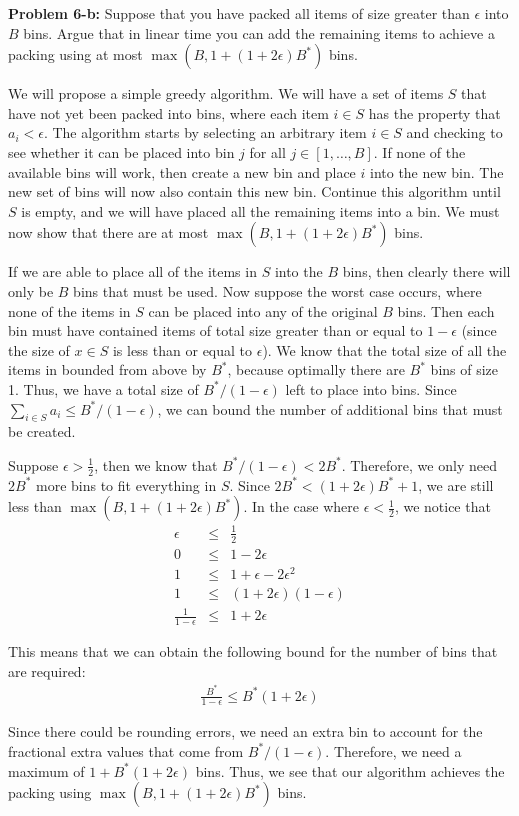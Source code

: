 \documentclass[psamsfonts]{amsart}
\newenvironment{sol}{\vspace{0.25cm}{\large \bfseries Solution:}}{\qedsymbol}
\newenvironment{prob}[1]{\begin{framed}{\large \bfseries Problem #1:}}{\end{framed}}
\begin{document}
\begin{prob}{6-b}
Suppose that you have packed all items of size greater than $\epsilon$ into $B$ bins. Argue that in linear time you can add the remaining items to achieve a packing using at most $\max(B, 1+(1+2\epsilon) B^*)$ bins.
\end{prob}
\begin{sol}
We will propose a simple greedy algorithm. We will have a set of items $S$ that have not yet been packed into bins, where each item $i \in S$ has the property that $a_i < \epsilon$. The algorithm starts by selecting an arbitrary item $i \in S$ and checking to see whether it can be placed into bin $j$ for all $j \in [1,\ldots, B]$. If none of the available bins will work, then create a new bin and place $i$ into the new bin. The new set of bins will now also contain this new bin. Continue this algorithm until $S$ is empty, and we will have placed all the remaining items into a bin. We must now show that there are at most $\max(B, 1 + (1+2 \epsilon) B^*)$ bins.

If we are able to place all of the items in $S$ into the $B$ bins, then clearly there will only be $B$ bins that must be used. Now suppose the worst case occurs, where none of the items in $S$ can be placed into any of the original $B$ bins. Then each bin must have contained items of total size greater than or equal to $1-\epsilon$ (since the size of $x \in S$ is less than or equal to $\epsilon$). We know that the total size of all the items in bounded from above by $B^*$, because optimally there are $B^*$ bins of size 1. Thus, we have a total size of $B^*/(1- \epsilon)$ left to place into bins. Since $\sum_{i \in S} a_i \leq B^*/(1-\epsilon)$, we can bound the number of additional bins that must be created.

Suppose $\epsilon > \frac{1}{2}$, then we know that $B^*/(1- \epsilon) < 2 B^*$. Therefore, we only need $2B^*$ more bins to fit everything in $S$. Since $2B^* < (1 + 2\epsilon)B^* + 1$, we are still less than $\max(B, 1 + (1 + 2 \epsilon) B^*)$. In the case where $\epsilon < \frac{1}{2}$, we notice that 
\begin{eqnarray}
\epsilon &\leq& \frac{1}{2} \\
0 &\leq& 1 - 2 \epsilon \\
1 &\leq& 1 + \epsilon - 2 \epsilon^2 \\
1 &\leq& (1+ 2 \epsilon) (1 - \epsilon) \\
\frac{1}{1-\epsilon} &\leq& 1 + 2 \epsilon
\end{eqnarray}

This means that we can obtain the following bound for the number of bins that are required:
\begin{eqnarray}
\frac{B^*}{1-\epsilon} \leq B^*(1 + 2 \epsilon)
\end{eqnarray}

Since there could be rounding errors, we need an extra bin to account for the fractional extra values that come from $B^*/(1 - \epsilon)$. Therefore, we need a maximum of $1 + B^*(1 + 2 \epsilon)$ bins. Thus, we see that our algorithm achieves the packing using $\max(B, 1 + (1 + 2\epsilon) B^*)$ bins.
\end{sol}
\end{document}
